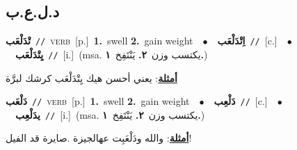 \documentclass[10pt,a4paper,twoside]{article} %
\begin{document}
\begin{multicols}{2}
\vspace{-3mm}
\subsection*{\color{blue}\foreignlanguage{arabic}{د.ل.ع.ب}\color{blue}{}} 

{\setlength\topsep{0pt}\textbf{\foreignlanguage{arabic}{تْدَلْعَب}}\ {\color{gray}\texttt{//}\color{black}}\ \textsc{verb}\ [p.]\ \textbf{1.}~swell  \textbf{2.}~gain weight\ \ $\bullet$\ \ \setlength\topsep{0pt}\textbf{\foreignlanguage{arabic}{اِتْدَلْعَب}}\ {\color{gray}\texttt{//}\color{black}}\ [c.]\ \ $\bullet$\ \ \setlength\topsep{0pt}\textbf{\foreignlanguage{arabic}{يِتْدَلْعَب}}\ {\color{gray}\texttt{//}\color{black}}\ [i.]\ \color{gray}(msa. \foreignlanguage{arabic}{يكتسب وزن}~\foreignlanguage{arabic}{\textbf{٢.}}  \foreignlanguage{arabic}{يَنْتَفِخ}~\foreignlanguage{arabic}{\textbf{١.}})\color{black}\  \begin{flushright}\color{gray}\foreignlanguage{arabic}{\textbf{\underline{\foreignlanguage{arabic}{أمثلة}}}: يعني أحسن هيك يِتْدَلْعَب كرشك لبرَّة}\end{flushright}\color{black}} \vspace{2mm}

{\setlength\topsep{0pt}\textbf{\foreignlanguage{arabic}{دَلْعَب}}\ {\color{gray}\texttt{//}\color{black}}\ \textsc{verb}\ [p.]\ \textbf{1.}~swell  \textbf{2.}~gain weight\ \ $\bullet$\ \ \setlength\topsep{0pt}\textbf{\foreignlanguage{arabic}{دَلْعِب}}\ {\color{gray}\texttt{//}\color{black}}\ [c.]\ \ $\bullet$\ \ \setlength\topsep{0pt}\textbf{\foreignlanguage{arabic}{يدَلْعِب}}\ {\color{gray}\texttt{//}\color{black}}\ [i.]\ \color{gray}(msa. \foreignlanguage{arabic}{يكتسب وزن}~\foreignlanguage{arabic}{\textbf{٢.}}  \foreignlanguage{arabic}{يَنْتَفِخ}~\foreignlanguage{arabic}{\textbf{١.}})\color{black}\  \begin{flushright}\color{gray}\foreignlanguage{arabic}{\textbf{\underline{\foreignlanguage{arabic}{أمثلة}}}: والله ودَلْعَبِت عهالجيزة .صايرة قد الفيل!}\end{flushright}\color{black}} \vspace{2mm}


\end{multicols}
\end{document}
